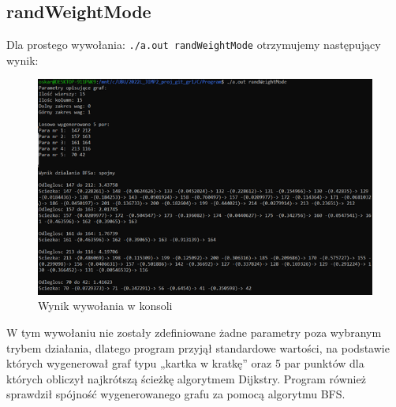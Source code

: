 \documentclass{article}
\begin{document}
\subsection {randWeightMode}
Dla prostego wywołania: \texttt{./a.out randWeightMode} otrzymujemy następujący wynik:
 \begin{figure}[htp]
\centering
\includegraphics[width=1\textwidth]{obraz5.png}
\caption{\label{fig:mod}Wynik wywołania w konsoli}
\end{figure}

 
 
W tym wywołaniu nie zostały zdefiniowane żadne parametry poza wybranym trybem działania, dlatego program przyjął standardowe wartości, na podstawie których wygenerował graf typu „kartka w kratkę” oraz 5 par punktów dla których obliczył najkrótszą ścieżkę algorytmem Dijkstry. Program również sprawdził spójność wygenerowanego grafu za pomocą algorytmu BFS. \\ \pagebreak
\end{document}
